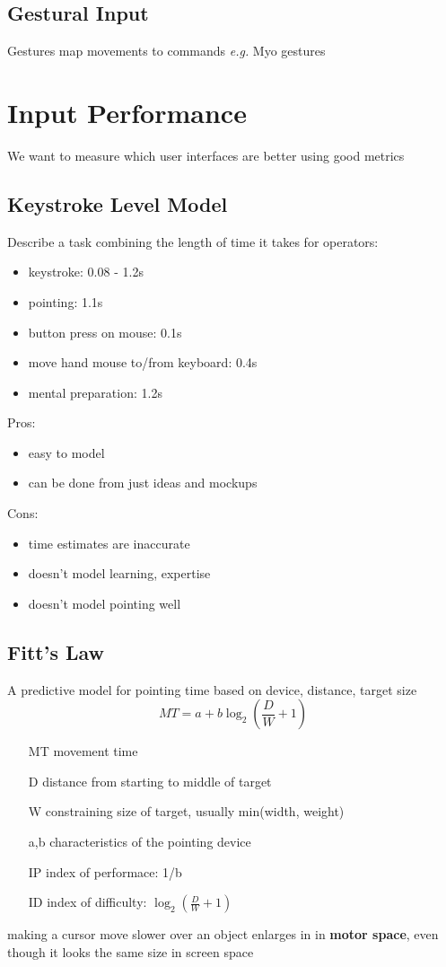 \documentclass[]{article}
\theoremstyle{definition}
\begin{document}
	\subsection{Gestural Input}
	Gestures map movements to commands \textit{e.g.} Myo gestures

	\section{Input Performance}
	We want to measure which user interfaces are better using good metrics
	\subsection{Keystroke Level Model}
	Describe a task combining the length of time it takes for operators:
	\begin{itemize}
		\item keystroke: 0.08 - 1.2s
		\item pointing: 1.1s
		\item button press on mouse: 0.1s
		\item move hand mouse to/from keyboard: 0.4s
		\item mental preparation: 1.2s
	\end{itemize}

	Pros:
	\begin{itemize}
		\item easy to model	
		\item can be done from just ideas and mockups
	\end{itemize}
	Cons:
	\begin{itemize}
		\item time estimates are inaccurate
		\item doesn't model learning, expertise
		\item doesn't model pointing well
	\end{itemize}
	
	\subsection{Fitt's Law}
	A predictive model for pointing time based on device, distance, target size
	\begin{equation*}
		MT = a + b \log_2 (\frac{D}{W} + 1)
	\end{equation*}
	\begin{itemize}
		\item[MT] movement time
		\item[D] distance from starting to middle of target
		\item[W] constraining size of target, usually min(width, weight)
		\item[a,b] characteristics of the pointing device
		\item[IP] index of performace: 1/b
		\item[ID] index of difficulty: $\log_2 (\frac{D}{W} + 1)$
	\end{itemize}
	making a cursor move slower over an object enlarges in in \textbf{motor space}, even
	though it looks the same size in screen space
\end{document}
